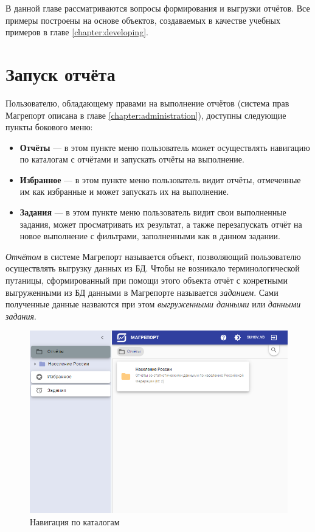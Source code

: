 \documentclass[../user-manual.tex]{subfiles}
\begin{document}
	
	В данной главе рассматриваются вопросы формирования и выгрузки отчётов. Все примеры построены на основе объектов, создаваемых в качестве учебных примеров в главе \ref{chapter:developing}.
	
	\section{Запуск отчёта}
	
	Пользователю, обладающему правами на выполнение отчётов (система прав Магрепорт описана в главе \ref{chapter:administration}), доступны следующие пункты бокового меню:
	\begin{itemize}
		\item \textbf{Отчёты} --- в этом пункте меню пользователь может осуществлять навигацию по каталогам с отчётами и запускать отчёты на выполнение.
		
		\item \textbf{Избранное} --- в этом пункте меню пользователь видит отчёты, отмеченные им как избранные и может запускать их на выполнение.
		
		\item \textbf{Задания} --- в этом пункте меню пользователь видит свои выполненные задания, может просматривать их результат, а также перезапускать отчёт на новое выполнение с фильтрами, заполненными как в данном задании.
	\end{itemize}


	\begin{NB}
		\textit{Отчётом} в системе Магрепорт называется объект, позволяющий пользователю осуществлять выгрузку данных из БД. Чтобы не возникало терминологической путаницы, сформированный при помощи этого объекта отчёт с конретными выгруженными из БД данными в Магрепорте называется \textit{заданием}. Сами полученные данные назваются при этом \textit{выгруженными данными} или \textit{данными задания}.
	\end{NB}
	
	
	\begin{figure}[h]
		\centering
		\includegraphics[width=\graphicswidth]{img/1-folders.png}
		\caption{Навигация по каталогам}
		\label{fig:folders}
	\end{figure}
	
\end{document}
